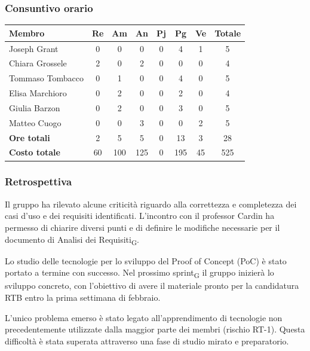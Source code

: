 \documentclass[11pt,a4paper]{article}
\newcommand{\gls}[1]{#1\textsubscript{G}}
\begin{document}
\subsubsection{Consuntivo orario}
\begin{center}
    \begin{tabular}{|l|c|c|c|c|c|c|c|}
        \hline
        \textbf{Membro} & \textbf{Re} & \textbf{Am} & \textbf{An} & \textbf{Pj} & \textbf{Pg} & \textbf{Ve} & \textbf{Totale} \\
        \hline
        Joseph Grant & 0 & 0 & 0 & 0 & 4 & 1 & 5 \\
        \hline
        Chiara Grossele & 2 & 0 & 2 & 0 & 0 & 0 & 4 \\
        \hline
        Tommaso Tombacco & 0 & 1 & 0 & 0 & 4 & 0 & 5 \\
        \hline
        Elisa Marchioro & 0 & 2 & 0 & 0 & 2 & 0 & 4 \\
        \hline
        Giulia Barzon & 0 & 2 & 0 & 0 & 3 & 0 & 5 \\
        \hline
        Matteo Cuogo & 0 & 0 & 3 & 0 & 0 & 2 & 5 \\
        \hline
        \textbf{Ore totali} & 2 & 5 & 5 & 0 & 13 & 3 & 28 \\
        \hline
        \textbf{Costo totale} & 60 & 100 & 125 & 0 & 195 & 45 & 525 \\
        \hline
    \end{tabular}
\end{center}

\subsubsection{Retrospettiva}
Il gruppo ha rilevato alcune criticità riguardo alla correttezza e completezza dei casi d’uso e dei requisiti identificati. L’incontro con il professor Cardin ha permesso di chiarire diversi punti e di definire le modifiche necessarie per il documento di \gls{Analisi dei Requisiti}.

Lo studio delle tecnologie per lo sviluppo del Proof of Concept (PoC) è stato portato a termine con successo. Nel prossimo \gls{sprint} il gruppo inizierà lo sviluppo concreto, con l’obiettivo di avere il materiale pronto per la candidatura RTB entro la prima settimana di febbraio.

L’unico problema emerso è stato legato all’apprendimento di tecnologie non precedentemente utilizzate dalla maggior parte dei membri (rischio RT-1). Questa difficoltà è stata superata attraverso una fase di studio mirato e preparatorio.
\end{document}

